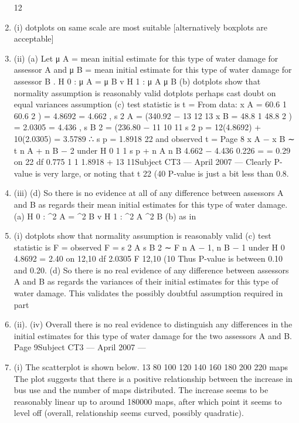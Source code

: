 \documentclass[a4paper,12pt]{article}
\begin{document}
\begin{enumerate}
12
\item (i)
dotplots on same scale are most suitable
[alternatively boxplots are acceptable]
\item (ii)
(a)
Let μ A = mean initial estimate for this type of water damage for assessor A and μ B = mean initial estimate for this type of water damage
for assessor B .
H 0 : μ A = μ B v H 1 : μ A \neq μ B
(b) dotplots show that normality assumption is reasonably valid
dotplots perhaps cast doubt on equal variances assumption
(c) test statistic is t =
From data: x A = 60.6
1
60.6 2
) = 4.8692
= 4.662 , s 2 A = (340.92 −
13
12
13
x B = 48.8
1
48.8 2
) = 2.0305
= 4.436 , s B 2 = (236.80 −
11
10
11
s 2 p = 12(4.8692) + 10(2.0305)
= 3.5789 ∴ s p = 1.8918
22
and
observed t =
Page 8
x A − x B
∼ t n A + n B − 2 under H 0
1
1
s p
+
n A n B
4.662 − 4.436
0.226
=
= 0.29 on 22 df
0.775
1 1
1.8918
+
13 11Subject CT3  — April 2007 — %
Clearly P-value is very large, or noting that t 22 (40%
P-value is just a bit less than 0.8.
\item (iii)
(d) So there is no evidence at all of any difference between assessors A
and B as regards their mean initial estimates for this type of water
damage.
(a) H 0 : \sigma^2 A = \sigma^2 B v H 1 : \sigma^2 A \neq \sigma^2 B
(b) as in \item (i) dotplots show that normality assumption is reasonably valid
(c) test statistic is F =
observed F =
s 2 A
s B 2
∼ F n A − 1, n B − 1 under H 0
4.8692
= 2.40 on 12,10 df
2.0305
F 12,10 (10%
Thus P-value is between 0.10 and 0.20.
(d)
So there is no real evidence of any difference between assessors A and B as regards the variances of their initial estimates for this type of water damage.
This validates the possibly doubtful assumption required in part \item (ii).
(iv)
Overall there is no real evidence to distinguish any differences in the initial
estimates for this type of water damage for the two assessors A and B.
Page 9Subject CT3  — April 2007 — %
\item (i)
The scatterplot is shown below.
13
80
100
120
140
160
180
200
220
maps
The plot suggests that there is a positive relationship between the increase in
bus use and the number of maps distributed. The increase seems to be
reasonably linear up to around 180000 maps, after which point it seems to
level off (overall, relationship seems curved, possibly quadratic).

\end{enumerate}
\end{document}
